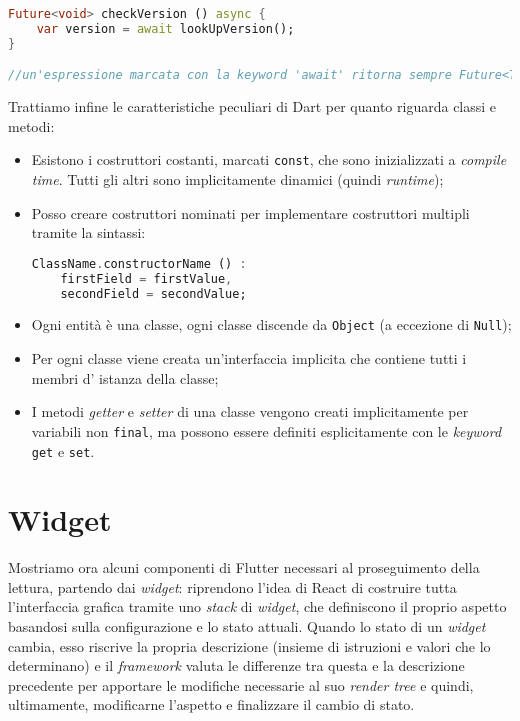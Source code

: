 \begin{appendices}
\begin{lstlisting}[language=dart, firstnumber=1,caption={Dart programmazione asincrona}]
Future<void> checkVersion () async {
    var version = await lookUpVersion();
}

//un'espressione marcata con la keyword 'await' ritorna sempre Future<T>
\end{lstlisting}

Trattiamo infine le caratteristiche peculiari di Dart per quanto riguarda classi e metodi:

\begin{itemize}
    \item Esistono i costruttori costanti, marcati \verb+const+, che sono inizializzati a \textit{compile time}. Tutti gli altri sono implicitamente dinamici (quindi \textit{runtime});
    \item Posso creare costruttori nominati per implementare costruttori multipli tramite la sintassi:
\begin{lstlisting}[language=dart]
ClassName.constructorName () :
    firstField = firstValue,
    secondField = secondValue;
\end{lstlisting}
    \item Ogni entità è una classe, ogni classe discende da \verb+Object+ (a eccezione di \verb+Null+);
    \item Per ogni classe viene creata un'interfaccia implicita che contiene tutti i membri d' istanza della classe;
    \item I metodi \textit{getter} e \textit{setter} di una classe vengono creati implicitamente per variabili non \verb+final+, ma possono essere definiti esplicitamente con le \textit{keyword} \verb+get+ e \verb+set+.
\end{itemize}

\section{Widget}
Mostriamo ora alcuni componenti di Flutter necessari al proseguimento della lettura, partendo dai \textit{widget}: riprendono l'idea di React di costruire tutta l'interfaccia grafica tramite uno \textit{stack} di \textit{widget}, che definiscono il proprio aspetto basandosi sulla configurazione e lo stato attuali. Quando lo stato di un \textit{widget} cambia, esso riscrive la propria descrizione (insieme di istruzioni e valori che lo determinano) e il \textit{framework} valuta le differenze tra questa e la descrizione precedente per apportare le modifiche necessarie al suo \textit{render tree} e quindi, ultimamente, modificarne l'aspetto e finalizzare il cambio di stato.


\end{appendices}
